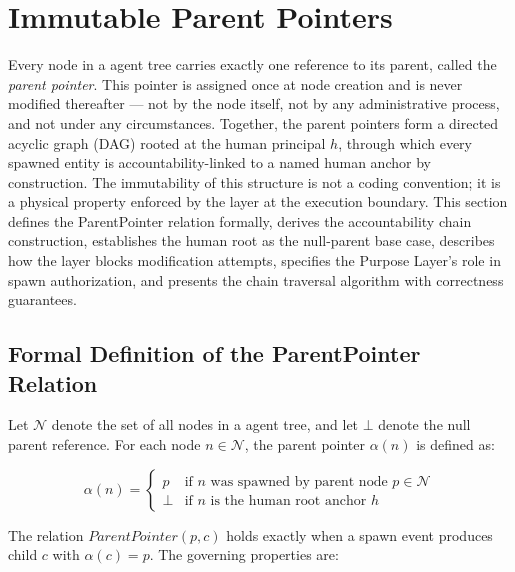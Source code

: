 \section{Immutable Parent Pointers}
\label{sec:immutable-parent-pointers}

Every node in a \bxthree{} agent tree carries exactly one reference to its parent, called the \emph{parent pointer}. This pointer is assigned once at node creation and is never modified thereafter — not by the node itself, not by any administrative process, and not under any circumstances. Together, the parent pointers form a directed acyclic graph (DAG) rooted at the human principal $h$, through which every spawned entity is accountability-linked to a named human anchor by construction. The immutability of this structure is not a coding convention; it is a physical property enforced by the \fact{} layer at the execution boundary. This section defines the ParentPointer relation formally, derives the accountability chain construction, establishes the human root as the null-parent base case, describes how the \fact{} layer blocks modification attempts, specifies the Purpose Layer's role in spawn authorization, and presents the chain traversal algorithm with correctness guarantees.

\subsection{Formal Definition of the ParentPointer Relation}

Let $\mathcal{N}$ denote the set of all nodes in a \bxthree{} agent tree, and let $\bot$ denote the null parent reference. For each node $n \in \mathcal{N}$, the parent pointer $\alpha(n)$ is defined as:

\begin{equation}
\alpha(n) =
\begin{cases}
p & \text{if } n \text{ was spawned by parent node } p \in \mathcal{N} \\[6pt]
\bot & \text{if } n \text{ is the human root anchor } h
\end{cases}
\tag{PP-1}
\end{equation}

The relation $\textit{ParentPointer}(p, c)$ holds exactly when a spawn event produces child $c$ with $\alpha(c) = p$. The governing properties are:

